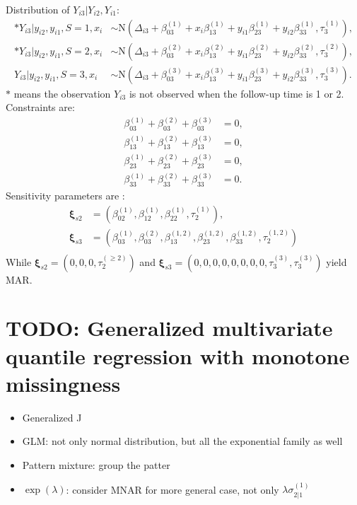 \documentclass[12pt]{article}
\begin{document}
Distribution of $Y_{i3} | Y_{i2}, Y_{i1}$:
\begin{align}
  \label{eq:tri3}
  * Y_{i3} | y_{i2}, y_{i1} , S = 1, x_i & \sim \textrm{N}(\Delta_{i3} + \beta_{03}^{(1)} + x_i\beta_{13}^{(1)} + y_{i1}\beta_{23}^{(1)} + y_{i2}\beta_{33}^{(1)}, \tau_3^{(1)}),  \\
  * Y_{i3} | y_{i2}, y_{i1} , S = 2, x_i & \sim \textrm{N}(\Delta_{i3} + \beta_{03}^{(2)} + x_i\beta_{13}^{(2)} + y_{i1}\beta_{23}^{(2)} + y_{i2}\beta_{33}^{(2)}, \tau_3^{(2)}),  \\
  Y_{i3} | y_{i2}, y_{i1} , S = 3, x_i & \sim \textrm{N}(\Delta_{i3} +
  \beta_{03}^{(3)} + x_i\beta_{13}^{(3)} + y_{i1}\beta_{23}^{(3)} +
  y_{i2}\beta_{33}^{(3)}, \tau_3^{(3)}).
\end{align}
$*$ means the observation $Y_{i3}$ is not observed when the follow-up
time is 1 or 2. Constraints are:
\begin{align}
  \label{eq:constbi3}
  \beta_{03}^{(1)} + \beta_{03}^{(2)}  + \beta_{03}^{(3)}& = 0 , \\
  \beta_{13}^{(1)} + \beta_{13}^{(2)}  + \beta_{13}^{(3)}& = 0 , \\
  \beta_{23}^{(1)} + \beta_{23}^{(2)}  + \beta_{23}^{(3)}& = 0 , \\
  \beta_{33}^{(1)} + \beta_{33}^{(2)} + \beta_{33}^{(3)}& = 0 .
\end{align}
Sensitivity parameters are :
\begin{align*}
  \bm \xi_{s2} &= (\beta_{02}^{(1)}, \beta_{12}^{(1)}, \beta_{22}^{(1)}, \tau_2^{(1)}), \\
  \bm \xi_{s3} &= (\beta_{03}^{(1)},\beta_{03}^{(2)},  \beta_{13}^{(1,2)}, \beta_{23}^{(1, 2)}, \beta_{33}^{(1,2)}, \tau_2^{(1, 2)}) \\
\end{align*}
While $\bm \xi_{s2} = (0, 0, 0, \tau_2^{(\geq 2)})$ and $\bm \xi_{s3}
= (0, 0, 0, 0, 0, 0, 0, 0, \tau_3^{(3)}, \tau_3^{(3)})$ yield MAR.
\section{TODO: Generalized multivariate quantile regression with monotone missingness }
\label{sec:general}

\begin{itemize}
\item Generalized J 
\item GLM: not only normal distribution, but all the exponential family as well
\item Pattern mixture: group the patter
\item $\exp(\lambda)$: consider MNAR for more general case, not only $\lambda\sigma_{2|1}^{(1)}$
\end{itemize}
\end{document}
